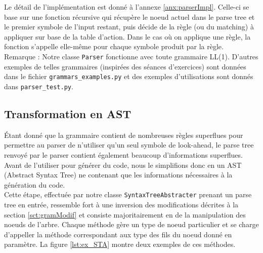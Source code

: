 \documentclass[a4paper,10pt]{article}
\begin{document}
Le détail de l'implémentation est donné à l'annexe \ref{anx:parserImpl}. Celle-ci se base sur une fonction récursive qui récupère le noeud actuel dans le parse tree et le premier symbole de l'input restant, puis décide de la règle (ou du matching) à appliquer sur base de la table d'action. Dans le cas où on applique une règle, la fonction s'appelle elle-même pour chaque symbole produit par la règle.\\

Remarque : Notre classe \verb?Parser? fonctionne avec toute grammaire LL(1). D'autres exemples de telles grammaires (inspirées des séances d'exercices) sont données dans le fichier \verb?grammars_examples.py? et des exemples d'utilisations sont donnés dans \verb?parser_test.py?.

\subsection{Transformation en AST}

Étant donné que la grammaire contient de nombreuses règles superflues pour permettre au parser de n'utiliser qu'un seul symbole de look-ahead, le parse tree renvoyé par le parser contient également beaucoup d'informations superflues. Avant de l'utiliser pour générer du code, nous le simplifions donc en un AST (Abstract Syntax Tree) ne contenant que les informations nécessaires à la génération du code.\\

Cette étape, effectuée par notre classe \verb?SyntaxTreeAbstracter? prenant un parse tree en entrée, ressemble fort à une inversion des modifications décrites à la section \ref{sct:gramModif} et consiste majoritairement en de la manipulation des noeuds de l'arbre. Chaque méthode gère un type de noeud particulier et se charge d'appeller la méthode correspondant aux type des fils du noeud donné en paramètre. La figure \ref{lst:ex_STA} montre deux exemples de ces méthodes.
\end{document}
